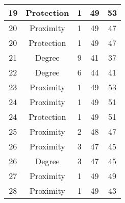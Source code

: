 \documentclass[results.tex]{subfiles}
\begin{document}
\begin{center}
\begin{tabular}{| c || c | c | c | c |}
            \hline
            19                      & Protection                   & 1                      & 49                      & 53                   \\
            \hline
            20                      & Proximity                    & 1                      & 49                      & 47                   \\
            \hline
            20                      & Protection                   & 1                      & 49                      & 47                   \\
            \hline
            21                      & Degree                       & 9                      & 41                      & 37                   \\
            \hline
            22                      & Degree                       & 6                      & 44                      & 41                   \\
            \hline
            23                      & Proximity                    & 1                      & 49                      & 53                   \\
            \hline
            24                      & Proximity                    & 1                      & 49                      & 51                   \\
            \hline
            24                      & Protection                   & 1                      & 49                      & 51                   \\
            \hline
            25                      & Proximity                    & 2                      & 48                      & 47                   \\
            \hline
            26                      & Proximity                    & 3                      & 47                      & 45                   \\
            \hline
            26                      & Degree                       & 3                      & 47                      & 45                   \\
            \hline
            27                      & Proximity                    & 1                      & 49                      & 49                   \\
            \hline
            28                      & Proximity                    & 1                      & 49                      & 43                   \\

\end{tabular}
\end{center}
\end{document}
